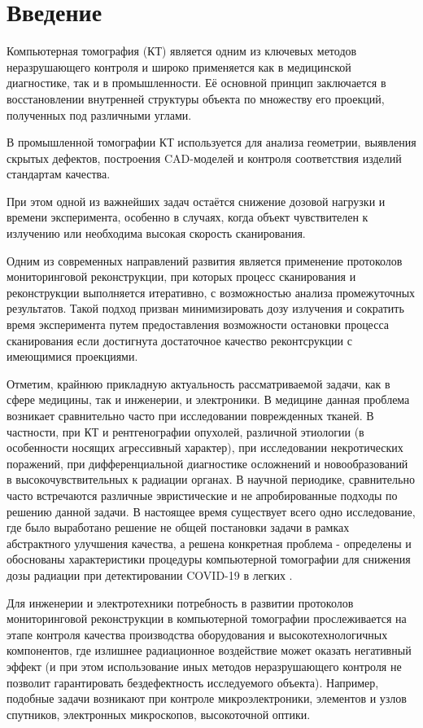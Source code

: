\section{Введение}
Компьютерная томография (КТ) является одним из ключевых методов неразрушающего контроля и широко применяется как в медицинской диагностике, так и в промышленности. Её основной принцип заключается в восстановлении внутренней структуры объекта по множеству его проекций, полученных под различными углами.

В промышленной томографии КТ используется для анализа геометрии, выявления скрытых дефектов, построения CAD-моделей и контроля соответствия изделий стандартам качества. 

При этом одной из важнейших задач остаётся снижение дозовой нагрузки и времени эксперимента, особенно в случаях, когда объект чувствителен к излучению или необходима высокая скорость сканирования.

Одним из современных направлений развития является применение протоколов мониторинговой реконструкции, при которых процесс сканирования и реконструкции выполняется итеративно, с возможностью анализа промежуточных результатов. Такой подход призван минимизировать дозу излучения и сократить время эксперимента путем предоставления возможности остановки процесса сканирования если достигнута достаточное качество реконтсрукции с имеющимися проекциями.

Отметим, крайнюю прикладную актуальность рассматриваемой задачи, как в сфере медицины, так и инженерии, и электроники. В медицине данная проблема возникает сравнительно часто при исследовании поврежденных тканей. В частности, при КТ и рентгенографии опухолей, различной этиологии (в особенности носящих агрессивный характер), при исследовании некротических поражений, при дифференциальной диагностике осложнений и новообразований в высокочувствительных к радиации органах. В научной периодике, сравнительно часто встречаются различные эвристические и не апробированные подходы по решению данной задачи. В настоящее время существует всего одно исследование, где было выработано решение не общей постановки задачи в рамках абстрактного улучшения качества, а решена конкретная проблема - определены и обоснованы характеристики процедуры компьютерной томографии для снижения дозы радиации при детектировании COVID-19 в легких \cite{bulatov2023reducing}. 

Для инженерии и электротехники потребность в развитии протоколов мониторинговой реконструкции в компьютерной томографии прослеживается на этапе контроля качества производства оборудования и высокотехнологичных компонентов, где излишнее радиационное воздействие может оказать негативный эффект (и при этом использование иных методов неразрушающего контроля не позволит гарантировать бездефектность исследуемого объекта). Например, подобные задачи возникают при контроле микроэлектроники, элементов и узлов спутников, электронных микроскопов, высокоточной оптики. 

